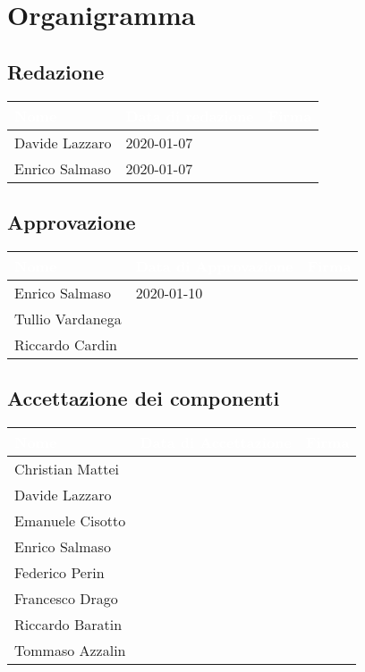 \section{Organigramma}
\subsection{Redazione}
{
	\renewcommand{\arraystretch}{2}
	\begin{longtable}{ C{5cm} C{4cm} C{5cm} }
		\textcolor{white}{\textbf{Nome}} & \textcolor{white}{\textbf{Data di redazione}} & \textcolor{white}{\textbf{Firma}}\\	\endhead
        
        Davide Lazzaro & 2020-01-07 &   \\
        Enrico Salmaso & 2020-01-07 &   \\
        		
	\end{longtable}
}

\subsection{Approvazione}
{
	\renewcommand{\arraystretch}{2}
	\centering
	\begin{longtable}{ C{5cm} C{4cm} C{5cm} }
		\textcolor{white}{\textbf{Nome}} & \textcolor{white}{\textbf{Data di Approvazione}} & \textcolor{white}{\textbf{Firma}}\\	\endhead
		
		
		Enrico Salmaso & 2020-01-10 &  \\
		Tullio Vardanega &  & \\
		Riccardo Cardin & &  \\
		
	\end{longtable}
}

\subsection{Accettazione dei componenti}
{
	\renewcommand{\arraystretch}{2}
	\begin{longtable}{ C{5cm} C{4cm} C{5cm} }
		\textcolor{white}{\textbf{Nome}} & \textcolor{white}{\textbf{Data di Accettazione}} & \textcolor{white}{\textbf{Firma}}\\	\endhead
		
		
		Christian Mattei & & \\
		Davide Lazzaro & & \\
		Emanuele Cisotto & & \\
		Enrico Salmaso & &  \\
		Federico Perin & & \\
		Francesco Drago & &  \\
		Riccardo Baratin & &  \\
		Tommaso Azzalin & &  \\
		
		
	\end{longtable}
}

